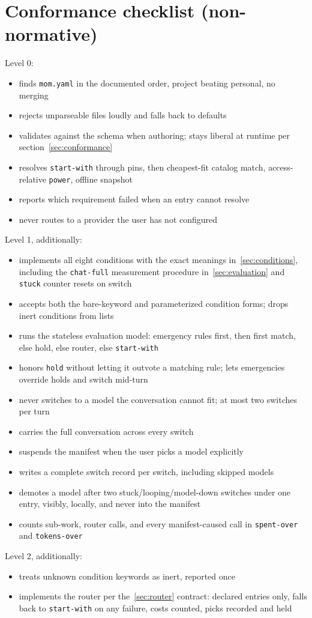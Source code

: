 \documentclass[11pt]{article}
\newcommand{\key}[1]{\texttt{#1}}
\newcommand{\checkbox}{\item[$\square$]}
\begin{document}
\appendix

\section{Conformance checklist (non-normative)}

Level 0:

\begin{itemize}
  \checkbox finds \key{mom.yaml} in the documented order, project beating
        personal, no merging
  \checkbox rejects unparseable files loudly and falls back to defaults
  \checkbox validates against the schema when authoring; stays liberal at
        runtime per section~\ref{sec:conformance}
  \checkbox resolves \key{start-with} through pins, then cheapest-fit
        catalog match, access-relative \key{power}, offline snapshot
  \checkbox reports which requirement failed when an entry cannot resolve
  \checkbox never routes to a provider the user has not configured
\end{itemize}

Level 1, additionally:

\begin{itemize}
  \checkbox implements all eight conditions with the exact meanings
        in~\ref{sec:conditions}, including the \key{chat-full} measurement
        procedure in~\ref{sec:evaluation} and \key{stuck} counter resets on
        switch
  \checkbox accepts both the bare-keyword and parameterized condition forms;
        drops inert conditions from lists
  \checkbox runs the stateless evaluation model: emergency rules first,
        then first match, else hold, else router, else \key{start-with}
  \checkbox honors \key{hold} without letting it outvote a matching rule;
        lets emergencies override holds and switch mid-turn
  \checkbox never switches to a model the conversation cannot fit; at most
        two switches per turn
  \checkbox carries the full conversation across every switch
  \checkbox suspends the manifest when the user picks a model explicitly
  \checkbox writes a complete switch record per switch, including skipped
        models
  \checkbox demotes a model after two stuck/looping/model-down switches
        under one entry, visibly, locally, and never into the manifest
  \checkbox counts sub-work, router calls, and every manifest-caused call in
        \key{spent-over} and \key{tokens-over}
\end{itemize}

Level 2, additionally:

\begin{itemize}
  \checkbox treats unknown condition keywords as inert, reported once
  \checkbox implements the router per the~\ref{sec:router} contract:
        declared entries only, falls back to \key{start-with} on any
        failure, costs counted, picks recorded and held
\end{itemize}
\end{document}
